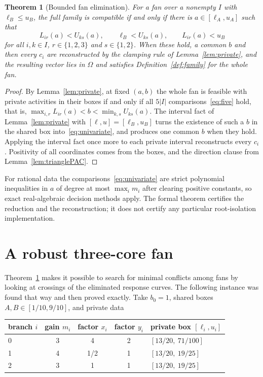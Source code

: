 \documentclass[11pt,a4paper]{article}
\theoremstyle{plain}
\newtheorem{theorem}{Theorem}[section]
\theoremstyle{definition}
\theoremstyle{remark}
\begin{document}
\begin{theorem}[Bounded fan elimination]\label{thm:fan}
For a fan over a nonempty $I$ with $\ell_B\le u_B$, the full family is compatible if and only if there is $a\in[\ell_A,u_A]$ such that
\begin{equation}\label{eq:univariate}
L_{ir}(a)<U_{ks}(a),\qquad \ell_B<U_{ks}(a),\qquad L_{ir}(a)<u_B
\end{equation}
for all $i,k\in I$, $r\in\{1,2,3\}$ and $s\in\{1,2\}$. When these hold, a common $b$ and then every $c_i$ are reconstructed by the clamping rule of Lemma~\ref{lem:private}, and the resulting vector lies in $\Omega$ and satisfies Definition~\ref{def:family} for the whole fan.
\end{theorem}
\begin{proof}
By Lemma~\ref{lem:private}, at fixed $(a,b)$ the whole fan is feasible with private activities in their boxes if and only if all $5|I|$ comparisons~\eqref{eq:five} hold, that is, $\max_{i,r}L_{ir}(a)<b<\min_{k,s}U_{ks}(a)$. The interval fact of Lemma~\ref{lem:private} with $[\ell,u]=[\ell_B,u_B]$ turns the existence of such a $b$ in the shared box into~\eqref{eq:univariate}, and produces one common $b$ when they hold. Applying the interval fact once more to each private interval reconstructs every $c_i$. Positivity of all coordinates comes from the boxes, and the direction clause from Lemma~\ref{lem:trianglePAC}.
\end{proof}

For rational data the comparisons~\eqref{eq:univariate} are strict polynomial inequalities in $a$ of degree at most $\max_i m_i$ after clearing positive constants, so exact real-algebraic decision methods apply. The formal theorem certifies the reduction and the reconstruction; it does not certify any particular root-isolation implementation.

\section{A robust three-core fan}\label{sec:robust}

Theorem~\ref{thm:fan} makes it possible to search for minimal conflicts among fans by looking at crossings of the eliminated response curves. The following instance was found that way and then proved exactly. Take $b_0=1$, shared boxes $A,B\in[1/10,9/10]$, and private data
\begin{center}
\begin{tabular}{@{}lcccl@{}}
\toprule
branch $i$ & gain $m_i$ & factor $x_i$ & factor $y_i$ & private box $[\ell_i,u_i]$ \\
\midrule
0 & 3 & 4 & 2 & $[13/20,\ 71/100]$ \\
1 & 4 & 1/2 & 1 & $[13/20,\ 19/25]$ \\
2 & 3 & 1 & 1 & $[13/20,\ 19/25]$ \\
\bottomrule
\end{tabular}
\end{center}
\end{document}
